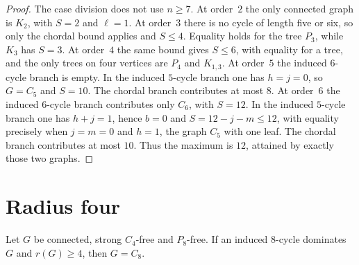 \documentclass[ASNA]{USG}
\theoremstyle{WBstyletwo}
\numberwithin{equation}{section}
\newcommand{\lr}{\ell}
\begin{document}
\begin{proof}
The case division does not use $n\ge 7$. At order~$2$ the only connected graph is $K_2$, with $S=2$ and $\lr=1$. At order~$3$ there is no cycle of length five or six, so only the chordal bound applies and $S\le 4$. Equality holds for the tree $P_3$, while $K_3$ has $S=3$. At order~$4$ the same bound gives $S\le 6$, with equality for a tree, and the only trees on four vertices are $P_4$ and $K_{1,3}$. At order~$5$ the induced $6$-cycle branch is empty. In the induced $5$-cycle branch one has $h=j=0$, so $G=C_5$ and $S=10$. The chordal branch contributes at most $8$. At order~$6$ the induced $6$-cycle branch contributes only $C_6$, with $S=12$. In the induced $5$-cycle branch one has $h+j=1$, hence $b=0$ and $S=12-j-m\le 12$, with equality precisely when $j=m=0$ and $h=1$, the graph $C_5$ with one leaf. The chordal branch contributes at most $10$. Thus the maximum is $12$, attained by exactly those two graphs.
\end{proof}

\section{Radius four}\label{sec:r4}

\begin{lemma}\label{lem:c8}
Let $G$ be connected, strong $C_4$-free and $P_8$-free. If an induced $8$-cycle dominates $G$ and $r(G)\ge 4$, then $G=C_8$.
\end{lemma}
\end{document}
